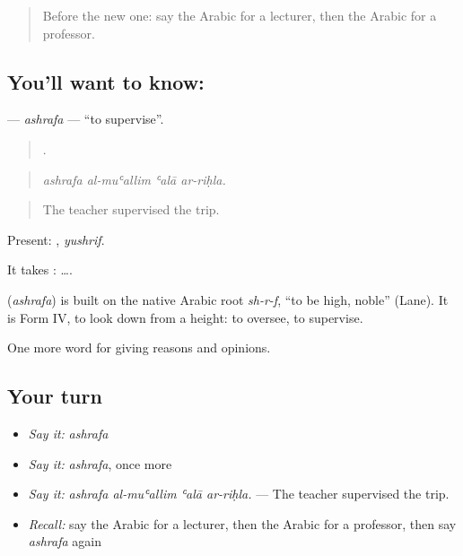 \label{lesson:AR-C392-ashrafa}



\begin{quote}
Before the new one: say the Arabic for a lecturer, then the Arabic for a professor.
\end{quote}

\subsection*{You'll want to know: }
\textbf{} — \emph{ashrafa} — \textquotedblleft{}to supervise\textquotedblright{}.

\begin{quote}
   .
\end{quote}

\begin{quote}
\emph{ashrafa al-muʿallim ʿalā ar-riḥla.}
\end{quote}

\begin{quote}
The teacher supervised the trip.
\end{quote}

Present: , \emph{yushrif}.

It takes :   ….

\begin{cousinweb}
\textbf{} (\emph{ashrafa}) is built on the native Arabic root \emph{sh-r-f}, \textquotedblleft{}to be high, noble\textquotedblright{} (Lane). It is Form IV, to look down from a height: to oversee, to supervise.
\end{cousinweb}

\begin{grammarlens}[title={What you've built}]
One more word for giving reasons and opinions.
\end{grammarlens}

\subsection*{Your turn}
\begin{itemize}
\raggedright
  \item \emph{Say it:} \emph{ashrafa}
  \item \emph{Say it:} \emph{ashrafa}, once more
  \item \emph{Say it:} \emph{ashrafa al-muʿallim ʿalā ar-riḥla.} — The teacher supervised the trip.
  \item \emph{Recall:} say the Arabic for a lecturer, then the Arabic for a professor, then say \emph{ashrafa} again
\end{itemize}

